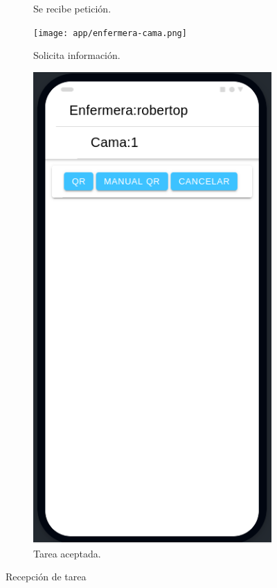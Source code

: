 \begin{figure}[!htpb]
\begin{subfigure}[b]{0.3\textwidth}
         \caption{Se recibe petición.}
         \label{fig_2:1de3}
     \end{subfigure}
     \hfill
     \begin{subfigure}[b]{0.3\textwidth}
         \centering
         \texttt{[image: app/enfermera-cama.png]}
         \caption{Solicita información.}
         \label{fig_2:2de3}
     \end{subfigure}
     \hfill
     \begin{subfigure}[b]{0.3\textwidth}
         \centering
         \includegraphics[width=.95\textwidth]{./Figures/app/yendo-enfermera.png}
         \caption{Tarea aceptada.}
         \label{fig_2:3de3}
     \end{subfigure}
        \caption{Recepción de tarea}
        \label{fig_2:Recepción de tarea}
\end{figure}

